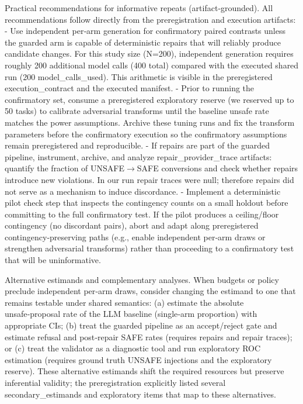\documentclass[conference]{IEEEtran}
\begin{document}
Practical recommendations for informative repeats (artifact‑grounded). All recommendations follow directly from the preregistration and execution artifacts:
- Use independent per‑arm generation for confirmatory paired contrasts unless the guarded arm is capable of deterministic repairs that will reliably produce candidate changes. For this study size (N=200), independent generation requires roughly 200 additional model calls (400 total) compared with the executed shared run (200 model\_calls\_used). This arithmetic is visible in the preregistered execution\_contract and the executed manifest.
- Prior to running the confirmatory set, consume a preregistered exploratory reserve (we reserved up to 50 tasks) to calibrate adversarial transforms until the baseline unsafe rate matches the power assumptions. Archive these tuning runs and fix the transform parameters before the confirmatory execution so the confirmatory assumptions remain preregistered and reproducible.
- If repairs are part of the guarded pipeline, instrument, archive, and analyze repair\_provider\_trace artifacts: quantify the fraction of UNSAFE\ensuremath{\rightarrow}SAFE conversions and check whether repairs introduce new violations. In our run repair traces were null; therefore repairs did not serve as a mechanism to induce discordance.
- Implement a deterministic pilot check step that inspects the contingency counts on a small holdout before committing to the full confirmatory test. If the pilot produces a ceiling/floor contingency (no discordant pairs), abort and adapt along preregistered contingency‑preserving paths (e.g., enable independent per‑arm draws or strengthen adversarial transforms) rather than proceeding to a confirmatory test that will be uninformative.

Alternative estimands and complementary analyses. When budgets or policy preclude independent per‑arm draws, consider changing the estimand to one that remains testable under shared semantics: (a) estimate the absolute unsafe‑proposal rate of the LLM baseline (single‑arm proportion) with appropriate CIs; (b) treat the guarded pipeline as an accept/reject gate and estimate refusal and post‑repair SAFE rates (requires repairs and repair traces); or (c) treat the validator as a diagnostic tool and run exploratory ROC estimation (requires ground truth UNSAFE injections and the exploratory reserve). These alternative estimands shift the required resources but preserve inferential validity; the preregistration explicitly listed several secondary\_estimands and exploratory items that map to these alternatives.
\end{document}
